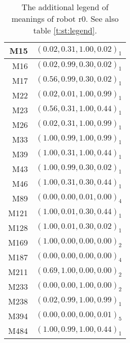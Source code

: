 \begin{table}[h]
\centering
{\footnotesize\begin{tabular}{||r|c||}
\hline\hline
M15 & $(0.02,0.31,1.00,0.02)_1$\\\hline
M16 & $(0.02,0.99,0.30,0.02)_1$\\\hline
M17 & $(0.56,0.99,0.30,0.02)_1$\\\hline
M22 & $(0.02,0.01,1.00,0.99)_1$\\\hline
M23 & $(0.56,0.31,1.00,0.44)_1$\\\hline
M26 & $(0.02,0.31,1.00,0.99)_1$\\\hline
M33 & $(1.00,0.99,1.00,0.99)_1$\\\hline
M39 & $(1.00,0.31,1.00,0.44)_1$\\\hline
M43 & $(1.00,0.99,0.30,0.02)_1$\\\hline
M46 & $(1.00,0.31,0.30,0.44)_1$\\\hline
M89 & $(0.00,0.00,0.01,0.00)_4$\\\hline
M121 & $(1.00,0.01,0.30,0.44)_1$\\\hline
M128 & $(1.00,0.01,0.30,0.02)_1$\\\hline
M169 & $(1.00,0.00,0.00,0.00)_2$\\\hline
M187 & $(0.00,0.00,0.00,0.00)_4$\\\hline
M211 & $(0.69,1.00,0.00,0.00)_2$\\\hline
M233 & $(0.00,0.00,1.00,0.00)_2$\\\hline
M238 & $(0.02,0.99,1.00,0.99)_1$\\\hline
M394 & $(0.00,0.00,0.00,0.01)_5$\\\hline
M484 & $(1.00,0.99,1.00,0.44)_1$\\\hline
\hline
\end{tabular}}
\caption{The additional legend of meanings of robot r0. See also table \ref{t:st:legend}.}
\label{t:st:legend0a}
\end{table}

